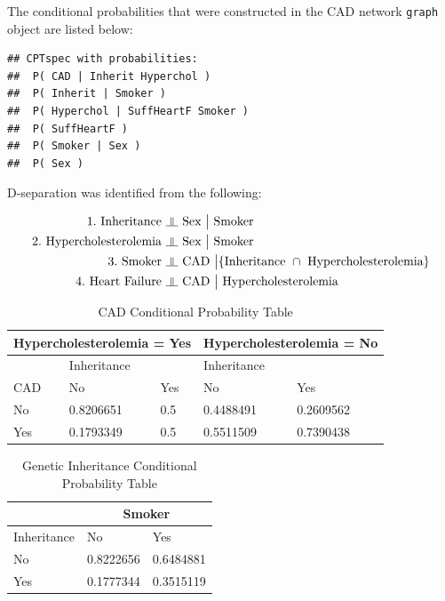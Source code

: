 \documentclass[]{article}
\newcommand{\indep}{\rotatebox[origin=c]{90}{$\models$}}
\begin{document}
The conditional probabilities that were constructed in the CAD network
\texttt{graph} object are listed below:

\begin{verbatim}
## CPTspec with probabilities:
##  P( CAD | Inherit Hyperchol )
##  P( Inherit | Smoker )
##  P( Hyperchol | SuffHeartF Smoker )
##  P( SuffHeartF )
##  P( Smoker | Sex )
##  P( Sex )
\end{verbatim}

\clearpage

D-separation was identified from the following:

\begin{align*}
1. \text{  Inheritance } &\indep \text{ Sex } \big| \text{ Smoker}\\
2. \text{  Hypercholesterolemia } &\indep \text{ Sex } \big| \text{ Smoker}\\
3. \text{  Smoker } &\indep \text{ CAD } \big| \{\text{Inheritance } \cap \text{ Hypercholesterolemia}\}\\
4. \text{  Heart Failure } &\indep \text{ CAD } \big| \text{ Hypercholesterolemia}\\
\end{align*}

\begin{table}[]
\centering
\label{my-label}
\begin{tabular}{|l|l|l|l|l|}
\hline
\multicolumn{3}{|c|}{Hypercholesterolemia = Yes}  & \multicolumn{2}{|c|}{Hypercholesterolemia = No} \\ \hline
                                    & \multicolumn{2}{|l|}{Inheritance}  &  \multicolumn{2}{|l|}{Inheritance}            \\ \hline
CAD                                 & No        & Yes & No                                 & Yes       \\ \hline
No                                  & 0.8206651 & 0.5 & 0.4488491                          & 0.2609562 \\ \hline
Yes                                 & 0.1793349 & 0.5 & 0.5511509                          & 0.7390438 \\ \hline
\end{tabular}
\caption{CAD Conditional Probability Table}
\end{table}

\begin{table}[]
\centering
\label{my-label}
\begin{tabular}{|l|l|l|}
\hline
        & \multicolumn{2}{|c|}{Smoker} \\ \hline
Inheritance & No        & Yes       \\ \hline
No      & 0.8222656 & 0.6484881 \\ \hline
Yes     & 0.1777344 & 0.3515119 \\ \hline
\end{tabular}
\caption{Genetic Inheritance Conditional Probability Table}
\end{table}
\end{document}
